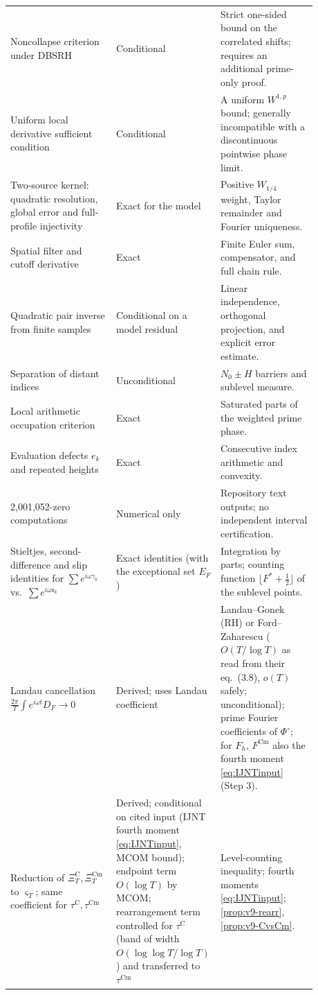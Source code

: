 \documentclass[11pt,a4paper]{article}
\numberwithin{equation}{section}
\theoremstyle{definition}
\theoremstyle{remark}
\newcommand{\Cm}{\mathrm{Cm}}
\begin{document}
\begin{longtable}{@{}p{0.34\linewidth}>{\raggedright\arraybackslash}p{0.23\linewidth}p{0.31\linewidth}@{}}
Noncollapse criterion under DBSRH & Conditional & Strict one-sided bound on the correlated shifts; requires an additional prime-only proof.\\
Uniform local derivative sufficient condition & Conditional & A uniform $W^{1,p}$ bound; generally incompatible with a discontinuous pointwise phase limit.\\
Two-source kernel: quadratic resolution, global error and full-profile injectivity & Exact for the model & Positive $W_{1/4}$ weight, Taylor remainder and Fourier uniqueness.\\
Spatial filter and cutoff derivative & Exact & Finite Euler sum, compensator, and full chain rule.\\
Quadratic pair inverse from finite samples & Conditional on a model residual & Linear independence, orthogonal projection, and explicit error estimate.\\
Separation of distant indices & Unconditional & $N_0\pm H$ barriers and sublevel measure.\\
Local arithmetic occupation criterion & Exact & Saturated parts of the weighted prime phase.\\
Evaluation defects $e_k$ and repeated heights & Exact & Consecutive index arithmetic and convexity.\\
2,001,052-zero computations & Numerical only & Repository text outputs; no independent interval certification.\\
Stieltjes, second-difference and slip identities for $\sum e^{i\omega\gamma_k}$ vs.\ $\sum e^{i\omega\mathsf x_k}$ & Exact identities (with the exceptional set $E_F$) & Integration by parts; counting function $\lfloor F^*+\frac12\rfloor$ of the sublevel points.\\
Landau cancellation $\frac{2\pi}T\int e^{i\omega t}D_F\to0$ & Derived; uses Landau coefficient & Landau--Gonek (RH) or Ford--Zaharescu ($O(T/\log T)$ as read from their eq.~(3.8), $o(T)$ safely; unconditional); prime Fourier coefficients of $\Phi^\circ$; for $F_h$, $F^{\Cm}$ also the fourth moment \eqref{eq:IJNTinput} (Step 3).\\
Reduction of $\Xi_T^{\mathrm C},\Xi_T^{\Cm}$ to $\varsigma_T$; same coefficient for $\tau^{\mathrm C},\tau^{\Cm}$ & Derived; conditional on cited input (IJNT fourth moment \eqref{eq:IJNTinput}, MCOM bound); endpoint term $O(\log T)$ by MCOM; rearrangement term controlled for $\tau^{\mathrm C}$ (band of width $O(\log\log T/\allowbreak\log T)$) and transferred to $\tau^{\Cm}$ & Level-counting inequality; fourth moments \eqref{eq:IJNTinput}; \cref{prop:v9-rearr}, \cref{prop:v9-CvsCm}.\\

\end{longtable}
\end{document}
